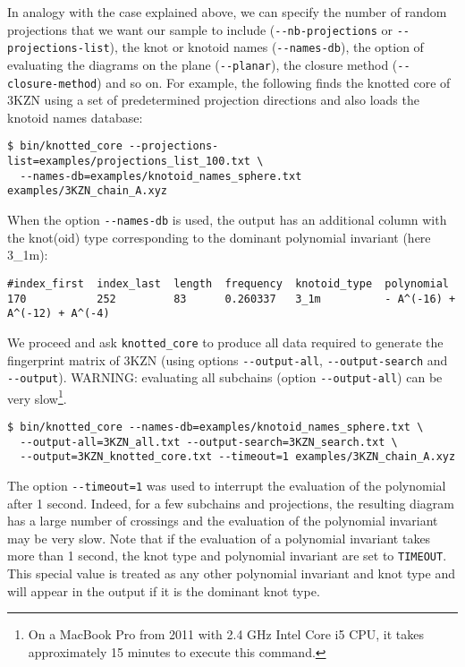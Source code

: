 In analogy with the case explained above, we can specify the number of random projections that we want our sample to include (\lstinline{--nb-projections} or \lstinline{--projections-list}), the knot or knotoid names (\lstinline{--names-db}), the option of evaluating the diagrams on the plane (\lstinline{--planar}), the closure method (\lstinline{--closure-method}) and so on. For example, the following finds the knotted core of 3KZN using a set of predetermined projection directions and also loads the knotoid names database:
\begin{lstlisting}
$ bin/knotted_core --projections-list=examples/projections_list_100.txt \
  --names-db=examples/knotoid_names_sphere.txt examples/3KZN_chain_A.xyz
\end{lstlisting}
When the option \lstinline{--names-db} is used, the output has an additional column with the knot(oid) type corresponding to the dominant polynomial invariant (here 3\_1m):
\begin{lstlisting}
#index_first  index_last  length  frequency  knotoid_type  polynomial
170           252         83      0.260337   3_1m          - A^(-16) + A^(-12) + A^(-4)
\end{lstlisting}



We proceed and ask \lstinline{knotted_core} to produce all data required to generate the fingerprint matrix of 3KZN (using options \lstinline{--output-all}, \lstinline{--output-search} and \lstinline{--output}). WARNING: evaluating all subchains (option \lstinline{--output-all}) can be very slow\footnote{On a MacBook Pro from 2011 with 2.4 GHz Intel Core i5 CPU, it takes approximately 15 minutes to execute this command.}.
\begin{lstlisting}
$ bin/knotted_core --names-db=examples/knotoid_names_sphere.txt \
  --output-all=3KZN_all.txt --output-search=3KZN_search.txt \
  --output=3KZN_knotted_core.txt --timeout=1 examples/3KZN_chain_A.xyz
\end{lstlisting}
The option \lstinline{--timeout=1} was used to interrupt the evaluation of the polynomial after 1 second. Indeed, for a few subchains and projections, the resulting diagram has a large number of crossings and the evaluation of the polynomial invariant may be very slow. Note that if the evaluation of a polynomial invariant takes more than 1 second, the knot type and polynomial invariant are set to \lstinline{TIMEOUT}. This special value is treated as any other polynomial invariant and knot type and will appear in the output if it is the dominant knot type.

